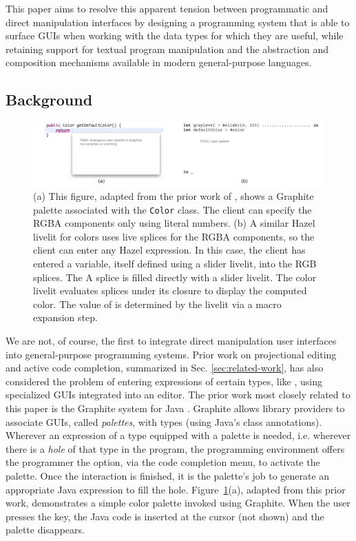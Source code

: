 This paper aims to resolve this apparent tension between 
programmatic and direct manipulation interfaces by designing a programming system that 
is able to surface GUIs when working with the data types for which 
they are useful, while retaining support for textual program manipulation  
and the abstraction and composition mechanisms
available in modern general-purpose languages.

\subsection{Background}
\begin{figure}
  \begin{center}
  \includegraphics[width=35pc]{color-palettes.png}\end{center}
  \caption{
  (a) This figure, adapted from the prior work of \citet{Graphite}, 
  shows a Graphite palette associated with the \texttt{Color} class. 
  The client can specify the RGBA components only using literal numbers. 
  (b) A similar Hazel livelit for colors uses live splices for the RGBA components,
  so the client can enter any Hazel expression. 
  In this case, the client has entered a variable, itself defined using a slider livelit, into the RGB 
  splices. The A splice is filled directly with a slider livelit. 
  The color livelit evaluates splices under its closure to display the 
  computed color. 
  The value of  is determined by the livelit via a macro expansion step.}
  \label{fig:color}
\end{figure}

We are not, of course, the first to integrate direct manipulation user interfaces
into general-purpose programming systems.
Prior work on projectional editing
and active code completion, summarized in Sec. \ref{sec:related-work}, 
has also considered the problem of entering expressions 
of certain types, like , 
using specialized GUIs integrated into an editor. 
The prior work most closely related to this paper is the {Graphite} system for Java \cite{Graphite}.
Graphite allows library providers to associate GUIs, called \emph{palettes}, with types (using Java's class annotations). 
Wherever an expression of a type equipped with a palette is needed, 
i.e. wherever there is a \emph{hole} of that type in the program, 
the programming environment offers the programmer the option, via the code completion menu, 
to activate the palette. 
Once the interaction is finished, it is the palette's job to generate an 
appropriate Java expression to fill the hole. 
Figure~\ref{fig:color}(a), adapted from this prior work, demonstrates a simple color palette invoked using Graphite.
When the user presses the  key, the Java code  is inserted at the cursor (not shown) and the palette disappears.

